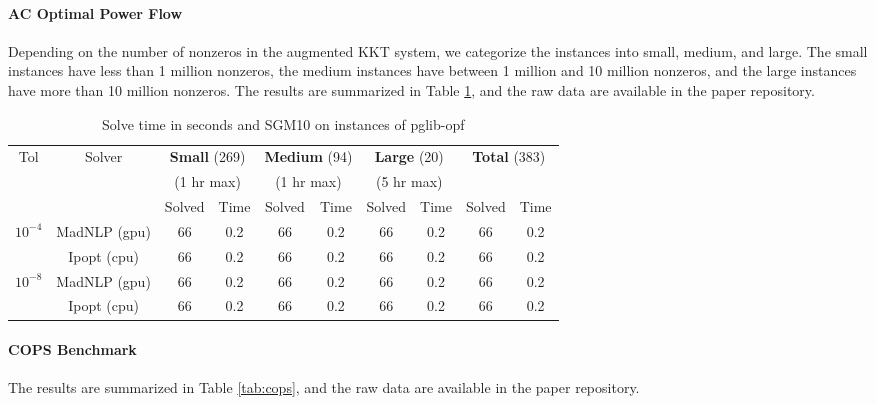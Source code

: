 \documentclass{article}
\begin{document}
\paragraph{AC Optimal Power Flow}
Depending on the number of nonzeros in the augmented KKT system, we categorize the instances into small, medium, and large. The small instances have less than 1 million nonzeros, the medium instances have between 1 million and 10 million nonzeros, and the large instances have more than 10 million nonzeros. The results are summarized in Table \ref{tab:pglib-opf}, and the raw data are available in the paper repository.

\begin{table}[t]
  \centering\small
  \caption{Solve time in seconds and SGM10 on instances of pglib-opf}\label{tab:pglib-opf}
  \begin{tabular}{|c|c|cc|cc|cc|cc|}
    \hline
    \multirow{ 3}{*}{Tol} & \multirow{ 3}{*}{Solver} & \multicolumn{2}{c|}{\textbf{Small} (269)}& \multicolumn{2}{c|}{\textbf{Medium} (94)}& \multicolumn{2}{c|}{\textbf{Large} (20)}& \multicolumn{2}{c|}{\multirow{2}{*}{\textbf{Total} (383)}}\\
                          && \multicolumn{2}{c|}{(1 hr max)}& \multicolumn{2}{c|}{(1 hr max)}& \multicolumn{2}{c|}{(5 hr max)}&&\\
                          &&  Solved & Time &  Solved & Time &  Solved & Time &  Solved & Time \\
    \hline
    \multirow{2}{*}{$10^{-4}$} & MadNLP (gpu) & 66 & 0.2 & 66 & 0.2 & 66 & 0.2 & 66 & 0.2  \\
                          & Ipopt (cpu) & 66 & 0.2 & 66 & 0.2 & 66 & 0.2 & 66 & 0.2 \\
    \hline
    \multirow{2}{*}{$10^{-8}$} & MadNLP (gpu) & 66 & 0.2 & 66 & 0.2 & 66 & 0.2& 66 & 0.2 \\
                          & Ipopt (cpu) & 66 & 0.2 & 66 & 0.2 & 66 & 0.2& 66 & 0.2 \\
    \hline
  \end{tabular}
\end{table}


\paragraph{COPS Benchmark}
The results are summarized in Table \ref{tab:cops}, and the raw data are available in the paper repository.
\end{document}
